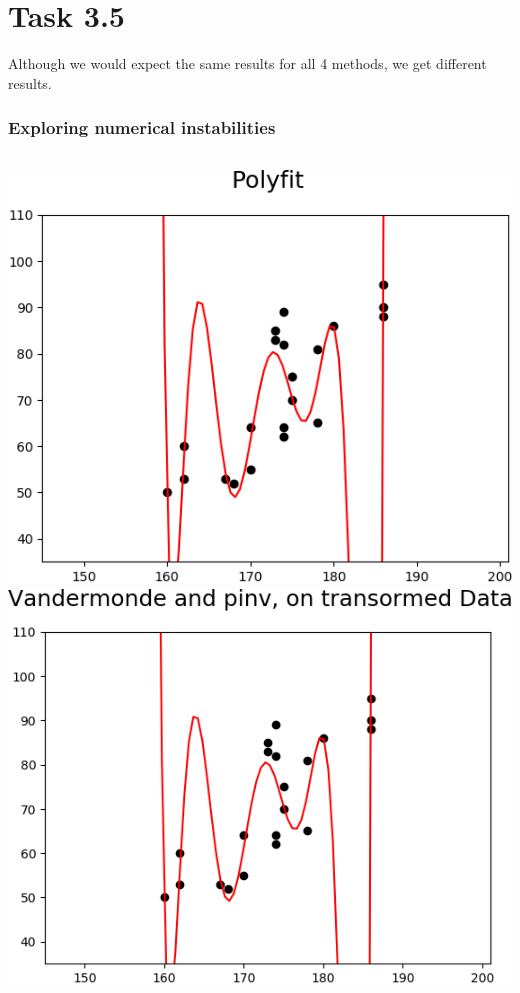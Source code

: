 \documentclass{beamer}
\begin{document}
\section{Task 3.5}
\begin{frame}
Although we would expect the same results for all 4 methods, we get different results.
\end{frame}
\begin{frame}
	\frametitle{Exploring numerical instabilities}
	\vspace{0.2cm}
	\begin{columns}[t]
		\centering
		\includegraphics[width=0.9\linewidth]{graphics/polyfit_mark}\\
		\vspace{0.2cm}
		\includegraphics[width=0.9\linewidth]{graphics/polyvander_pinv_transformed_mark}

\end{columns}
\end{frame}
\end{document}
